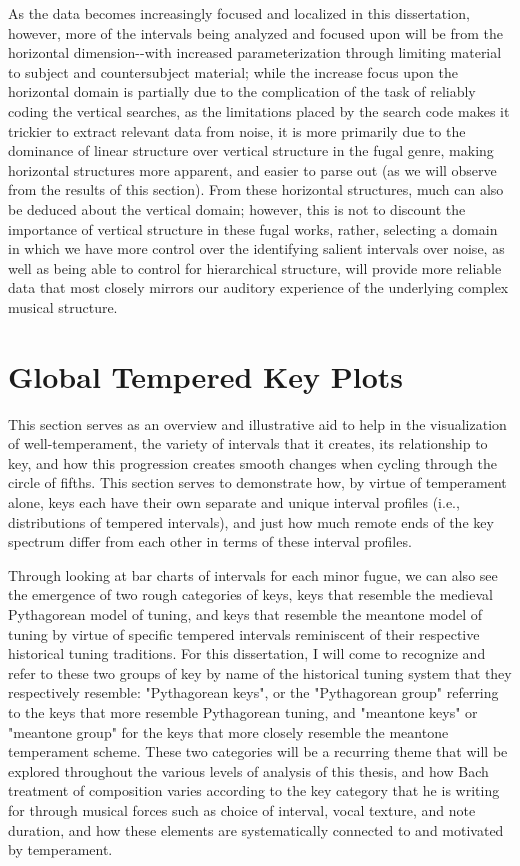 As the data becomes increasingly focused and localized in this
dissertation, however, more of the intervals being analyzed and focused
upon will be from the horizontal dimension-\/-with increased
parameterization through limiting material to subject and countersubject
material; while the increase focus upon the horizontal domain is
partially due to the complication of the task of reliably coding the
vertical searches, as the limitations placed by the search code makes it
trickier to extract relevant data from noise, it is more primarily due
to the dominance of linear structure over vertical structure in the
fugal genre, making horizontal structures more apparent, and easier to
parse out (as we will observe from the results of this section). From
these horizontal structures, much can also be deduced about the vertical
domain; however, this is not to discount the importance of vertical
structure in these fugal works, rather, selecting a domain in which we
have more control over the identifying salient intervals over noise, as
well as being able to control for hierarchical structure, will provide
more reliable data that most closely mirrors our auditory experience of
the underlying complex musical structure.

    \section{Global Tempered Key Plots}\label{global-tempered-key-plots}

    This section serves as an overview and illustrative aid to help in the
visualization of well-temperament, the variety of intervals that it
creates, its relationship to key, and how this progression creates
smooth changes when cycling through the circle of fifths. This section
serves to demonstrate how, by virtue of temperament alone, keys each
have their own separate and unique interval profiles (i.e.,
distributions of tempered intervals), and just how much remote ends of
the key spectrum differ from each other in terms of these interval
profiles.

Through looking at bar charts of intervals for each minor fugue, we can
also see the emergence of two rough categories of keys, keys that
resemble the medieval Pythagorean model of tuning, and keys that
resemble the meantone model of tuning by virtue of specific tempered
intervals reminiscent of their respective historical tuning traditions.
For this dissertation, I will come to recognize and refer to these two
groups of key by name of the historical tuning system that they
respectively resemble: "Pythagorean keys", or the "Pythagorean group"
referring to the keys that more resemble Pythagorean tuning, and
"meantone keys" or "meantone group" for the keys that more closely
resemble the meantone temperament scheme. These two categories will be a
recurring theme that will be explored throughout the various levels of
analysis of this thesis, and how Bach treatment of composition varies
according to the key category that he is writing for through musical
forces such as choice of interval, vocal texture, and note duration, and
how these elements are systematically connected to and motivated by
temperament.

